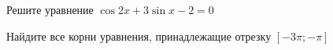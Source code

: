 \begin{ex}
	\begin{condition}
		\begin{enumcols}[label=\asbuk*)]
			\item Решите уравнение \( \cos 2x + 3\sin x -2= 0 \)
			\item Найдите все корни уравнения, принадлежащие отрезку \( \left[-3\pi;-\pi\right] \)
		\end{enumcols}
	\end{condition}
\end{ex}